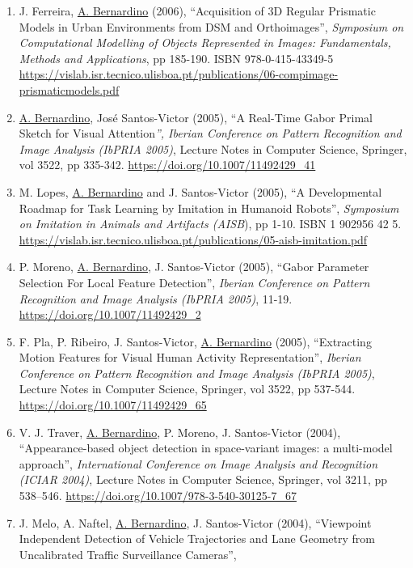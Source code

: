 \documentclass[
]{article}
\begin{document}
\begin{enumerate}
  Head'', \emph{IEEE International Conference on Robotics and Automation
  (ICRA)}, pp 94-100. \url{https://doi.org/10.1109/ROBOT.2006.1641167}~
\item
  J. Ferreira, \ul{A. Bernardino} (2006), ``Acquisition of 3D Regular
  Prismatic Models in Urban Environments from DSM and Orthoimages'',
  \emph{Symposium on Computational Modelling of Objects Represented in
  Images: Fundamentals, Methods and Applications}, pp 185-190. ISBN
  978-0-415-43349-5
  \url{https://vislab.isr.tecnico.ulisboa.pt/publications/06-compimage-prismaticmodels.pdf}
\item
  \ul{A. Bernardino}, José Santos-Victor (2005), ``A Real-Time Gabor
  Primal Sketch for Visual Attention\emph{'', Iberian Conference on
  Pattern Recognition and Image Analysis (IbPRIA 2005)}, Lecture Notes
  in Computer Science, Springer, vol 3522, pp 335-342.
  \url{https://doi.org/10.1007/11492429_41}~
\item
  M. Lopes, \ul{A. Bernardino} and J. Santos-Victor (2005), ``A
  Developmental Roadmap for Task Learning by Imitation in Humanoid
  Robots'', \emph{Symposium on Imitation in Animals and Artifacts
  (AISB}), pp 1-10. ISBN 1 902956 42 5.
  \url{https://vislab.isr.tecnico.ulisboa.pt/publications/05-aisb-imitation.pdf}~
\item
  P. Moreno, \ul{A. Bernardino}, J. Santos-Victor (2005), ``Gabor
  Parameter Selection For Local Feature Detection'', \emph{Iberian
  Conference on Pattern Recognition and Image Analysis (IbPRIA 2005)},
  11-19. \url{https://doi.org/10.1007/11492429_2}~
\item
  F. Pla, P. Ribeiro, J. Santos-Victor, \ul{A. Bernardino} (2005),
  ``Extracting Motion Features for Visual Human Activity
  Representation'', \emph{Iberian Conference on Pattern Recognition and
  Image Analysis (IbPRIA 2005)}, Lecture Notes in Computer Science,
  Springer, vol 3522, pp 537-544.
  \url{https://doi.org/10.1007/11492429_65}~
\item
  V. J. Traver, \ul{A. Bernardino}, P. Moreno, J. Santos-Victor (2004),
  ``Appearance-based object detection in space-variant images: a
  multi-model approach'', \emph{International Conference on Image
  Analysis and Recognition (ICIAR 2004)}, Lecture Notes in Computer
  Science, Springer, vol 3211, pp 538--546.
  \url{https://doi.org/10.1007/978-3-540-30125-7_67}~
\item
  J. Melo, A. Naftel, \ul{A. Bernardino}, J. Santos-Victor (2004),
  ``Viewpoint Independent Detection of Vehicle Trajectories and Lane
  Geometry from Uncalibrated Traffic Surveillance Cameras'',

\end{enumerate}
\end{document}
